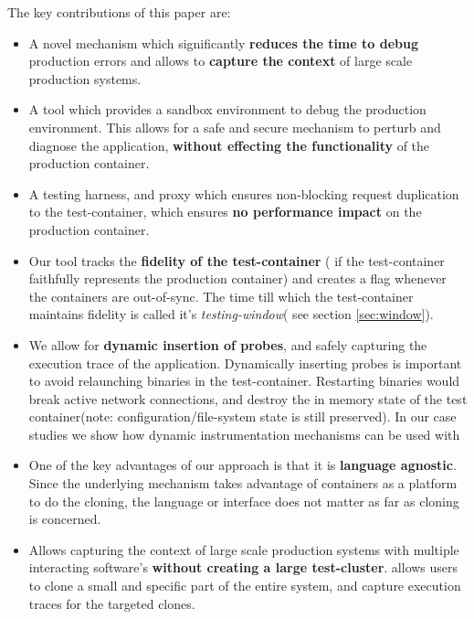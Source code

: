 The key contributions of this paper are:

\begin{itemize}[leftmargin=*,topsep=0pt,itemsep=-1ex,partopsep=1ex,parsep=1ex]
\item A novel mechanism which significantly \textbf{reduces the time to debug} production errors and allows to \textbf{capture the context} of large scale production systems.
\item A tool which provides a sandbox environment to debug the production environment. 
This allows for a safe and secure mechanism to perturb and diagnose the application, \textbf{without effecting the functionality} of the  production container.

\item A testing harness, and proxy which ensures non-blocking request duplication to the test-container, which ensures \textbf{no performance impact} on the production container. 

\item Our tool tracks the \textbf{fidelity of the test-container} ( if the test-container faithfully represents the production container) and creates a flag whenever the containers are out-of-sync. 
The time till which the test-container maintains fidelity is called it's \emph{testing-window}( see section \ref{sec:window}).

\item We allow for \textbf{dynamic insertion of probes}, and safely capturing the execution trace of the application. 
Dynamically inserting probes is important to avoid relaunching binaries in the test-container. 
Restarting binaries would break active network connections, and destroy the in memory state of the test container(note: configuration/file-system state is still preserved).
In our case studies we show how dynamic instrumentation mechanisms can be used with \parikshan

\item One of the key advantages of our approach is that it is \textbf{language agnostic}. 
Since the underlying mechanism takes advantage of containers as a platform to do the cloning, the language or interface does not matter as far as cloning is concerned. 

\item Allows capturing the context of large scale production systems with multiple interacting software's \textbf{without creating a large test-cluster}. \parikshan allows users to clone a small and specific part of the entire system, and capture execution traces for the targeted clones.

\end{itemize}

